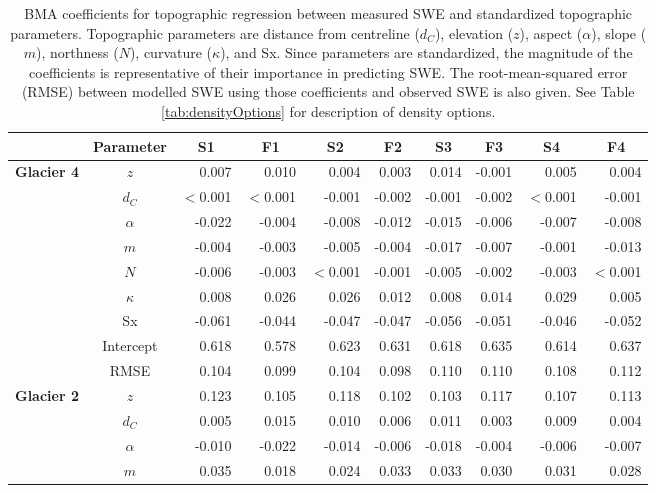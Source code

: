 \documentclass{sfuthesis}
\newcommand{\params}{Topographic parameters are distance from centreline ($d_C$), elevation ($z$), aspect ($\alpha$), slope ($m$), northness ($N$), curvature ($\kappa$), and Sx. }
\begin{document}
\begin{table}
\footnotesize
\centering
\caption{BMA coefficients for topographic regression between measured SWE and standardized topographic parameters. \params  Since parameters are standardized, the magnitude of the coefficients is representative of their importance in predicting SWE. The root-mean-squared error (RMSE) between modelled SWE using those coefficients and observed SWE is also given. See Table \ref{tab:densityOptions} for description of density options.}
\label{tab:BMAcoeffFull}
\begin{tabular}{ccrrrrrrrr}
\textbf{} & \textbf{Parameter} & \multicolumn{1}{c}{\textbf{S1}} & \multicolumn{1}{c}{\textbf{F1}} & \multicolumn{1}{c}{\textbf{S2}} & \multicolumn{1}{c}{\textbf{F2}} & \multicolumn{1}{c}{\textbf{S3}} & \multicolumn{1}{c}{\textbf{F3}} & \multicolumn{1}{c}{\textbf{S4}} & \multicolumn{1}{c}{\textbf{F4}} \\ \hline \hline
\multirow{9}{*}{\textbf{Glacier 4}} & $z$ & 0.007 & 0.010 & 0.004 & 0.003 & 0.014 & -0.001 & 0.005 & 0.004 \\
 & $d_C$ & $<$0.001 & $<$0.001 & -0.001 & -0.002 & -0.001 & -0.002 & $<$0.001 & -0.001 \\
 & $\alpha$ & -0.022 & -0.004 & -0.008 & -0.012 & -0.015 & -0.006 & -0.007 & -0.008 \\
 & $m$ & -0.004 & -0.003 & -0.005 & -0.004 & -0.017 & -0.007 & -0.001 & -0.013 \\
 & $N$ & -0.006 & -0.003 & $<$0.001 & -0.001 & -0.005 & -0.002 & -0.003 & $<$0.001 \\
 & $\kappa$ & 0.008 & 0.026 & 0.026 & 0.012 & 0.008 & 0.014 & 0.029 & 0.005 \\
 & Sx & -0.061 & -0.044 & -0.047 & -0.047 & -0.056 & -0.051 & -0.046 & -0.052 \\
 & Intercept & 0.618 & 0.578 & 0.623 & 0.631 & 0.618 & 0.635 & 0.614 & 0.637 \\
 & RMSE & 0.104 & 0.099 & 0.104 & 0.098 & 0.110 & 0.110 & 0.108 & 0.112 \\ \hline
\multirow{9}{*}{\textbf{Glacier 2}} & $z$ & 0.123 & 0.105 & 0.118 & 0.102 & 0.103 & 0.117 & 0.107 & 0.113 \\
 & $d_C$ & 0.005 & 0.015 & 0.010 & 0.006 & 0.011 & 0.003 & 0.009 & 0.004 \\
 & $\alpha$ & -0.010 & -0.022 & -0.014 & -0.006 & -0.018 & -0.004 & -0.006 & -0.007 \\
 & $m$ & 0.035 & 0.018 & 0.024 & 0.033 & 0.033 & 0.030 & 0.031 & 0.028 \\

\end{tabular}
\end{table}
\end{document}
